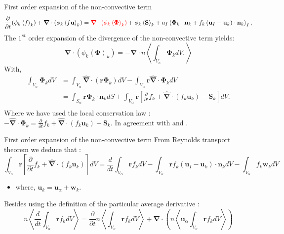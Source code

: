 \documentclass{sintefbeamer}
\newcommand{\kavg}[1]{\left<#1\right>_k}
\newcommand{\Iavg}[1]{\left<#1\right>_I}
\newcommand{\pavg}[1]{n \left<#1\right>}
\newcommand{\nablab}{\bm{\nabla}}
\newcommand{\nablabh}{\hat{\bm{\nabla}}}
\newcommand{\ddt}{\frac{d}{d t}}
\newcommand{\pddt}{\frac{\partial}{\partial t}}
\begin{document}
\begin{frame}  {First order expansion of the non-convective term}
  \begin{equation*}
    \pddt (\phi_k\kavg{f})
    +\nablab \cdot \left(
        \phi_k \kavg{f \textbf{u}}
    \right)
    = \textcolor{red}{\nablab \cdot \left(
        \phi_k \kavg{\bm{\Phi}}
    \right)}
    + \phi_k \kavg{\textbf{S}}
    + a_I \Iavg{
        \bm{\Phi}_k \cdot \textbf{n}_k
        + f_k 
        \left(
            \textbf{u}_I
            - \textbf{u}_k
        \right) \cdot \textbf{n}_k
    },
\end{equation*}
  The $1^{st}$ order expansion of the divergence of the non-convective term yields:
  \begin{equation*}
    \nablab\cdot
    (\phi_k \kavg{\bm{\Phi}})=
        - \nablab \cdot
        \pavg{
          \int_{V_\alpha}
          \bm{\Phi}_k dV,
        }
\end{equation*}
With,
\begin{align*}
    \int_{V_\alpha} \bm{\Phi}_k  dV
    &= \int_{V_\alpha}  \nablabh \cdot \left(\textbf{r} \bm{\Phi}_k\right) dV
    - \int_{V_\alpha} \textbf{r} \nablabh \cdot \mathbf{\Phi}_k dV\\
    &=\int_{S_\alpha} \textbf{r} \bm{\Phi}_k \cdot \textbf{n}_k dS
    + \int_{V_\alpha} \textbf{r} \left[
        \pddt f_k 
        + \nablabh \cdot (f_k \textbf{u}_k)
        - \textbf{S}_k
    \right] dV.\\
\end{align*}
Where we have used the local conservation law :
 $-\nablabh \cdot \bm{\Phi}_k
  = \pddt f_k  + \nablabh \cdot (f_k \textbf{u}_k)
  - \textbf{S}_k$. 
  In agreement with \citet{nott2011suspension} and \citet{prosperetti2004average}.
\end{frame}

\begin{frame}
  {First order expansion of the non-convective term}
From Reynolds transport theorem we deduce that :
\begin{equation*}
  \int_{V_\alpha} \textbf{r} \left[\pddt f_k + \nablabh \cdot (f_k \textbf{u}_k)\right]dV
  = \ddt \int_{V_\alpha} \textbf{r} f_k dV 
  - \int_{V_\alpha} \textbf{r} f_k (\textbf{u}_I   - \textbf{u}_k) \cdot \textbf{n}_k dV
  - \int_{V_\alpha} f_k \textbf{w}_k dV
\end{equation*}
\begin{itemize}
  \item where, $\textbf{u}_k = \textbf{u}_\alpha + \textbf{w}_k$.
\end{itemize}
Besides using the definition of the particular average derivative : 
\begin{equation*}
  \pavg{\ddt \int_{V_\alpha} \textbf{r} f_k dV}
  = \pddt \pavg{\int_{V_\alpha} \textbf{r} f_k dV}
  + \nablab\cdot\left(\pavg{\textbf{u}_\alpha \int_{V_\alpha} \textbf{r} f_k dV}\right)
\end{equation*}
\end{frame}
\end{document}
